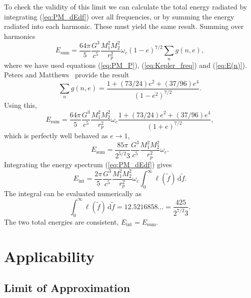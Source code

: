 \documentclass[aps,prd,amsfonts,amssymb,amsmath,nofootinbib,floatfix,reprint,showpacs,groupedaddress]{revtex4-1}
\newcommand{\eqnref}[1]{(\ref{eq:#1})}
\newcommand{\sub}[1]{\ensuremath{_\text{#1}}}
\newcommand{\dd}{\ensuremath{\mathrm{d}}}
\newcommand{\intd}[4]{\ensuremath{\int_{#1}^{#2}{#3}\,\dd{#4}}}
\begin{document}
To check the validity of this limit we can calculate the total energy radiated by integrating \eqnref{PM_dEdf} over all frequencies, or by summing the energy radiated into each harmonic. These must yield the same result. Summing over harmonics
\begin{equation}
E\sub{sum} = \frac{64\pi}{5}\frac{G^3}{c^5}\frac{M_1^2M_2^2}{r_{p}^2}\omega_{c}(1-e)^{7/2}\sum_n g(n,e),
\end{equation}
where we have used equations \eqnref{PM_P}, \eqnref{Kepler_freq} and \eqnref{E(n)}. Peters and Matthews~\cite{Peters1963} provide the result
\begin{equation}
\sum_n g(n,e) = \frac{1 + (73/24)e^2 + (37/96)e^4}{(1-e^2)^{7/2}}.
\end{equation}
Using this,
\begin{equation}
E\sub{sum} = \frac{64\pi}{5}\frac{G^3}{c^5}\frac{M_1^2M_2^2}{r_{p}^2}\omega_{c}\frac{1 + (73/24)e^2 + (37/96)e^4}{(1+e)^{7/2}},
\end{equation}
which is perfectly well behaved as $e \rightarrow 1$,
\begin{equation}
E\sub{sum} = \frac{85\pi}{2^{5/2}3}\frac{G^3}{c^5}\frac{M_1^2M_2^2}{r_{p}^2}\omega_{c}.
\label{eq:PM_total}
\end{equation}
Integrating the energy spectrum \eqnref{PM_dEdf} gives
\begin{equation}
E\sub{int} = \frac{2\pi}{5}\frac{G^3}{c^5}\frac{M_1^2M_2^2}{r_{p}^2}\omega_{c}\intd{0}{\infty}{\ell(\tilde{f})}{\tilde{f}}.
\end{equation}
The integral can be evaluated numerically as
\begin{equation}
\intd{0}{\infty}{\ell(\tilde{f})}{\tilde{f}} = 12.5216858\ldots = \frac{425}{2^{7/2}3}.
\end{equation}
The two total energies are consistent, $E\sub{int} = E\sub{sum}$.

\section{Applicability\label{sec:application}}

\subsection{Limit of Approximation}
\end{document}
